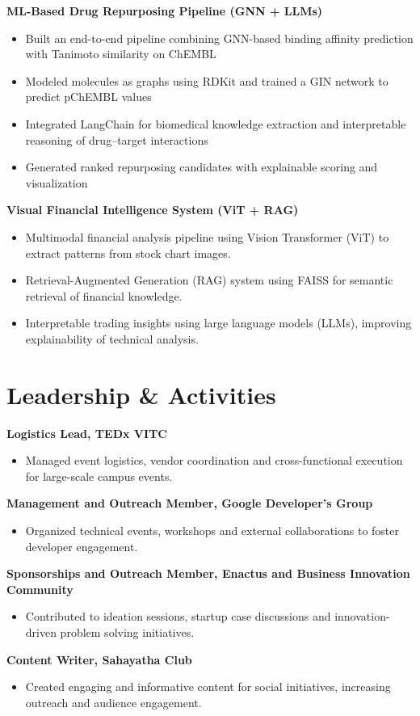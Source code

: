 \documentclass[a4paper,10pt]{article}
\begin{document}
\noindent\textbf{ML-Based Drug Repurposing Pipeline (GNN + LLMs)}
\begin{itemize}
    \item Built an end-to-end pipeline combining GNN-based binding affinity prediction with Tanimoto similarity on ChEMBL
    \item Modeled molecules as graphs using RDKit and trained a GIN network to predict pChEMBL values
    \item Integrated LangChain for biomedical knowledge extraction and interpretable reasoning of drug--target interactions
    \item Generated ranked repurposing candidates with explainable scoring and visualization
\end{itemize}


\noindent\textbf{Visual Financial Intelligence System (ViT + RAG)}
\begin{itemize}
    \item Multimodal financial analysis pipeline using Vision Transformer (ViT) to extract patterns from stock chart images.
    \item Retrieval-Augmented Generation (RAG) system using FAISS for semantic retrieval of financial knowledge.
    \item Interpretable trading insights using large language models (LLMs), improving explainability of technical analysis.
\end{itemize}

\section{Leadership \& Activities}

\noindent\textbf{Logistics Lead, TEDx VITC}
\begin{itemize}
    \item Managed event logistics, vendor coordination and cross-functional execution for large-scale campus events.
\end{itemize}

\noindent\textbf{Management and Outreach Member, Google Developer's Group}
\begin{itemize}
    \item Organized technical events, workshops and external collaborations to foster developer engagement.
\end{itemize}

\noindent\textbf{Sponsorships and Outreach Member, Enactus and Business Innovation Community}
\begin{itemize}
    \item Contributed to ideation sessions, startup case discussions and innovation-driven problem solving initiatives.
\end{itemize}
\textbf{Content Writer, Sahayatha Club} 
\begin{itemize}
    \item Created engaging and informative content for social initiatives, increasing outreach and audience engagement.
\end{itemize}
\end{document}

